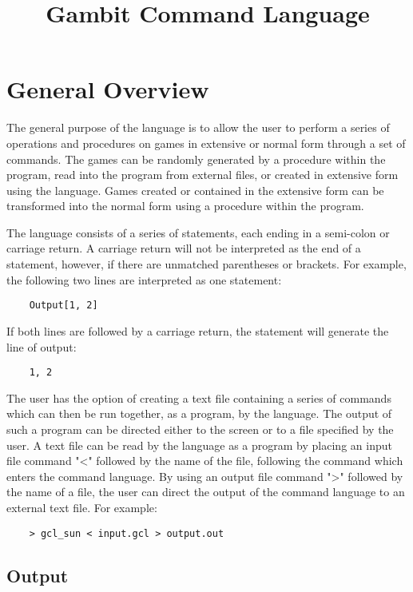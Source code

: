 

\title{Gambit Command Language}

\section*{General Overview}

The general purpose of the language is to allow the user to perform a series of
operations and procedures on games in extensive or normal form through a set of
commands.  The games can be randomly generated by a procedure within the
program, read into the program from external files, or created in extensive
form using the language.  Games created or contained in the extensive form can
be transformed into the normal form using a procedure within the program.

The language consists of a series of statements, each ending in a semi-colon
or carriage return.  A carriage return will not be interpreted as the end of a
statement, however, if there are unmatched parentheses or brackets.  For
example, the following two lines are interpreted as one statement:

\begin{verbatim}
	Output[1, 2]
\end{verbatim}

If both lines are followed by a carriage return, the statement will generate
the line of output: 

\begin{verbatim}
	1, 2
\end{verbatim}

The user has the option of creating a text file containing a series of commands
which can then be run together, as a program, by the language.  The output of 
such a program can be directed either to the screen or to a file specified by 
the user.  A text file can be read by the language as a program by placing an 
input file command "<" followed by the name of the file, following the command 
which enters the command language.  By using an output file command ">" 
followed by the name of a file, the user can direct the output of the command
language to an external text file.  For example:

\begin{verbatim}
	> gcl_sun < input.gcl > output.out
\end{verbatim}

\subsection*{Output}

